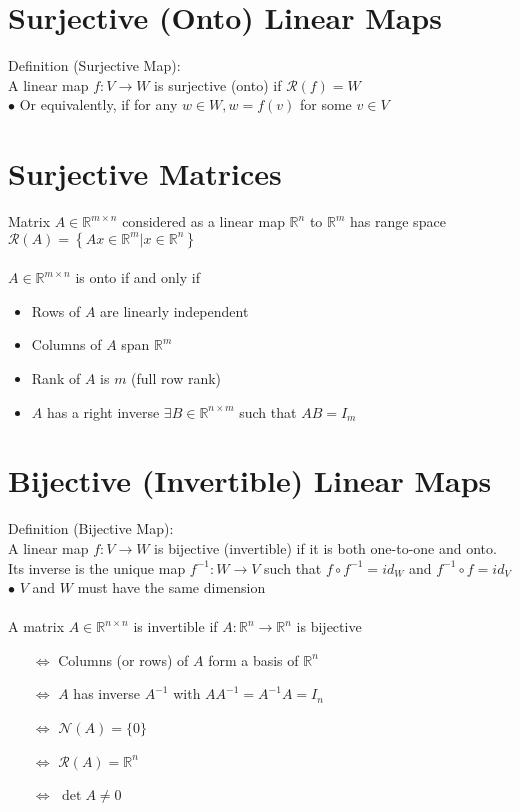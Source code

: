 \documentclass[10pt,a4paper,oneside]{article}
\begin{document}
\section{Surjective (Onto) Linear Maps}
Definition (Surjective Map):\\
A linear map $f:V\rightarrow W$ is surjective (onto) if $\mathcal{R}(f)=W$\\
$\bullet$ Or equivalently, if for any $w \in W, w=f(v)$ for some $v \in V$
\section{Surjective Matrices}
Matrix $A \in \mathbb{R}^{m \times n}$ considered as a linear map $\mathbb{R}^{n}$ to $\mathbb{R}^{m}$ has range space
$\mathcal{R}(A)=\left\{A x \in \mathbb{R}^{m} | x \in \mathbb{R}^{n}\right\}$
\\
\\$A\in\mathbb{R}^{m\times n}$ is onto if and only if
\begin{itemize}
\item Rows of $A$ are linearly independent
\item Columns of $A$ span $\mathbb{R}^{m}$
\item Rank of $A$ is $m$ (full row rank)
\item $A$ has a right inverse $\exists B \in \mathbb{R}^{n \times m}$ such that $A B=I_{m}$
\end{itemize}
\section{Bijective (Invertible) Linear Maps}
Definition (Bijective Map):\\
A linear map $f : V \rightarrow W$ is bijective (invertible) if it is both one-to-one and onto. Its inverse is the unique map $f^{-1} : W \rightarrow V$ such that $f \circ f^{-1}=i d_W$ and $f^{-1} \circ f=i d_V$\\
$\bullet$ $V$ and $W$ must have the same dimension\\
\\
A matrix $A\in \mathbb{R}^{n\times n}$ is invertible if $A : \mathbb{R}^{n} \rightarrow \mathbb{R}^{n}$ is bijective
\begin{itemize}
\item[$\Leftrightarrow$] Columns (or rows) of $A$ form a basis of $\mathbb{R}^{n}$
\item[$\Leftrightarrow$] $A$ has inverse $A^{-1}$ with $A A^{-1}=A^{-1} A=I_{n}$
\item[$\Leftrightarrow$] $\mathcal{N}(A)=\{0\}$
\item[$\Leftrightarrow$] $\mathcal{R}(A)=\mathbb{R}^{n}$
\item[$\Leftrightarrow$] $\operatorname{det} A \neq 0$
\end{itemize}
\end{document}
